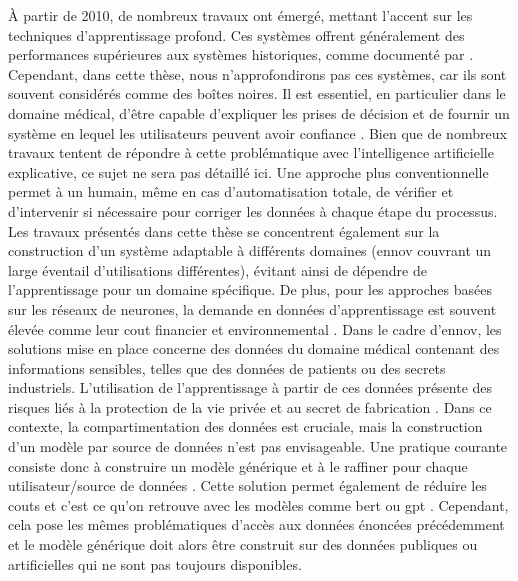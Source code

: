 À partir de 2010, de nombreux travaux ont émergé, mettant l'accent sur les techniques d'apprentissage profond.
Ces systèmes offrent généralement des performances supérieures aux systèmes historiques, comme documenté par \cite{al-aswadiAutomaticOntologyConstruction2020}.
Cependant, dans cette thèse, nous n'approfondirons pas ces systèmes, car ils sont souvent considérés comme des boîtes noires.
Il est essentiel, en particulier dans le domaine médical, d'être capable d'expliquer les prises de décision et de fournir un système en lequel les utilisateurs peuvent avoir confiance \cite{ribeiroWhyShouldTrust2016}.
Bien que de nombreux travaux tentent de répondre à cette problématique avec l'intelligence artificielle explicative, ce sujet ne sera pas détaillé ici.
Une approche plus conventionnelle permet à un humain, même en cas d'automatisation totale, de vérifier et d'intervenir si nécessaire pour corriger les données à chaque étape du processus.
Les travaux présentés dans cette thèse se concentrent également sur la construction d'un système adaptable à différents domaines (\gls{ennov} couvrant un large éventail d'utilisations différentes), évitant ainsi de dépendre de l'apprentissage pour un domaine spécifique.
De plus, pour les approches basées sur les réseaux de neurones, la demande en données d'apprentissage est souvent élevée comme leur cout financier et environnemental \cite{strubellEnergyPolicyConsiderations2019}.
Dans le cadre d'\gls{ennov}, les solutions mise en place concerne des données du domaine médical contenant des informations sensibles, telles que des données de patients ou des secrets industriels.
L'utilisation de l'apprentissage à partir de ces données présente des risques liés à la protection de la vie privée et au secret de fabrication \cite{fredriksonModelInversionAttacks2015,songPrivacyRisksSecuring2019}.
Dans ce contexte, la compartimentation des données est cruciale, mais la construction d'un modèle par source de données n'est pas envisageable.
Une pratique courante consiste donc à construire un modèle générique et à le raffiner pour chaque utilisateur/source de données \cite{ribeiroWhyShouldTrust2016}.
Cette solution permet également de réduire les couts et c'est ce qu'on retrouve avec les modèles comme \gls{bert} \cite{devlinBERTPretrainingDeep2019} ou \gls{gpt} \cite{radfordImprovingLanguageUnderstanding2018, brownLanguageModelsAre2020}. 
Cependant, cela pose les mêmes problématiques d'accès aux données énoncées précédemment et le modèle générique doit alors être construit sur des données publiques ou artificielles qui ne sont pas toujours disponibles.

